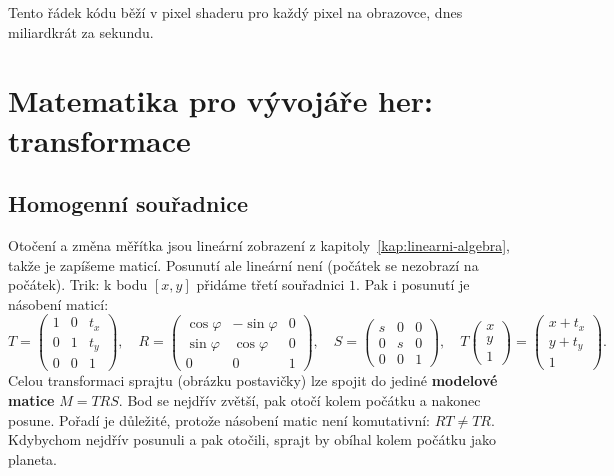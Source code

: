 Tento řádek kódu běží v pixel shaderu pro každý pixel na obrazovce, dnes miliardkrát za sekundu.

\section{Matematika pro vývojáře her: transformace}

\subsection{Homogenní souřadnice}

Otočení a změna měřítka jsou lineární zobrazení z kapitoly~\ref{kap:linearni-algebra}, takže je zapíšeme maticí. Posunutí ale lineární není (počátek se nezobrazí na počátek). Trik: k bodu $[x, y]$ přidáme třetí souřadnici $1$. Pak i posunutí je násobení maticí:
\begin{equation*}
  T = \begin{pmatrix}1 & 0 & t_x\\ 0 & 1 & t_y\\ 0 & 0 & 1\end{pmatrix},\quad
  R = \begin{pmatrix}\cos\varphi & -\sin\varphi & 0\\ \sin\varphi & \cos\varphi & 0\\ 0 & 0 & 1\end{pmatrix},\quad
  S = \begin{pmatrix}s & 0 & 0\\ 0 & s & 0\\ 0 & 0 & 1\end{pmatrix},\quad
  T\begin{pmatrix}x\\ y\\ 1\end{pmatrix} = \begin{pmatrix}x + t_x\\ y + t_y\\ 1\end{pmatrix}.
\end{equation*}
Celou transformaci sprajtu (obrázku postavičky) lze spojit do jediné \textbf{modelové matice} $M = TRS$. Bod se nejdřív zvětší, pak otočí kolem počátku a nakonec posune. Pořadí je důležité, protože násobení matic není komutativní: $RT\neq TR$. Kdybychom nejdřív posunuli a pak otočili, sprajt by obíhal kolem počátku jako planeta.

